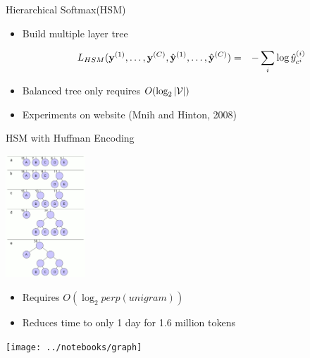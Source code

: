 \documentclass{beamer}
\begin{document}
\begin{frame}{Hierarchical Softmax(HSM) }
  \begin{itemize}
    \item Build multiple layer tree

      \begin{eqnarray*}
        L_{HSM}(\mathbf{y}^{(1)}, \ldots,  \mathbf{y}^{(C)}, \hat{\mathbf{y}}^{(1)}, \ldots,  \hat{\mathbf{y}}^{(C)})
                                                                                    &=& - \sum_{i} \log \hat{y}^{(i)}_{c^{{i}}}  \\
      \end{eqnarray*}


  \item Balanced tree only requires $O(\log_2 |\mathcal{V}|)$

  \air
  \item Experiments on website (Mnih and Hinton, 2008)
  \end{itemize}
\end{frame}

\begin{frame}{HSM with Huffman Encoding}
  \begin{center}
    \includegraphics[width=3cm]{HuffmanCodeAlg}
  \end{center}
  \begin{itemize}

  \item Requires $O(\log_2 perp(unigram))$
  \item Reduces time to only 1 day for 1.6 million tokens
  \end{itemize}

\end{frame}

\begin{frame}
  \vspace{-5cm}

  \hspace*{-2cm}
  \texttt{[image: ../notebooks/graph]}
\end{frame}
\end{document}
